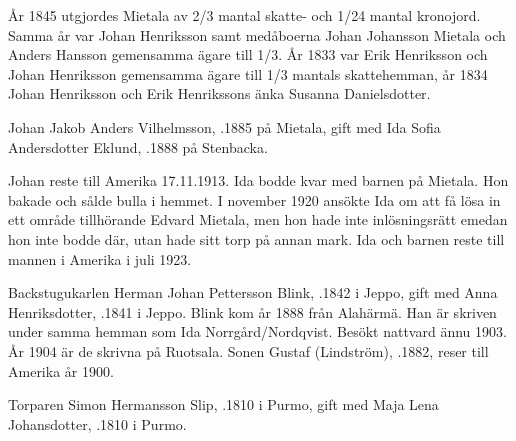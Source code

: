 År 1845 utgjordes Mietala av 2/3 mantal skatte- och 1/24 mantal kronojord. Samma år var Johan Henriksson samt medåboerna Johan Johansson Mietala och Anders Hansson gemensamma ägare till 1/3. År 1833 var Erik Henriksson och Johan Henriksson gemensamma ägare till 1/3 mantals skattehemman, år 1834 Johan Henriksson och Erik Henrikssons änka Susanna Danielsdotter.





Johan Jakob Anders Vilhelmsson, .1885 på Mietala, gift med Ida Sofia Andersdotter Eklund, .1888 på Stenbacka.
\begin{jhchildren}
  \item {}
  \item {}
  \item {}
\end{jhchildren}

Johan reste till Amerika 17.11.1913. Ida bodde kvar med barnen på Mietala. Hon bakade och sålde bulla i hemmet. I november 1920 ansökte Ida om att få lösa in ett område tillhörande Edvard Mietala, men hon hade inte inlösningsrätt emedan hon inte bodde där, utan hade sitt torp på annan mark. Ida och barnen reste till mannen i Amerika i juli 1923.


Backstugukarlen Herman Johan Pettersson Blink, .1842 i Jeppo, gift med Anna Henriksdotter, .1841 i Jeppo. Blink kom år 1888 från Alahärmä. Han är skriven under samma hemman som Ida Norrgård/Nordqvist. Besökt nattvard ännu 1903. År 1904 är de skrivna på Ruotsala. Sonen Gustaf (Lindström), .1882, reser till Amerika år 1900.


Torparen Simon Hermansson Slip, .1810 i Purmo, gift med Maja Lena Johansdotter, .1810 i Purmo.
\begin{jhchildren}
  \item {}
  \item {}
  \item {}
  \item {}
  \item {}
  \item {}
\end{jhchildren}


